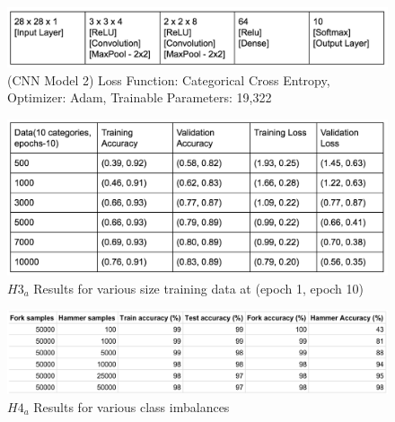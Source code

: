 \documentclass[11pt]{article}
\begin{document}
\begin{figure}[h!]
  \begin{center}
    \includegraphics[scale=0.5]{fig4}
  \end{center}
  \caption{(CNN Model 2) Loss Function: Categorical Cross Entropy, Optimizer:
    Adam, Trainable Parameters: 19,322}
  \label{fig:cnnArchPool}
\end{figure}


\begin{figure}[h!]
  \begin{center}
    \includegraphics[scale=0.5]{fig8}
    \end{center}
  \caption{$H3_a$ Results for various size training data at (epoch 1,
    epoch 10)}
  \label{fig:h3Results}
  \end{figure}


\begin{figure}[h!]
  \begin{center}
    \includegraphics[scale=0.5]{fig9}
    \end{center}
  \caption{$H4_a$ Results for various class imbalances}
  \label{fig:h4Results}
\end{figure}

\end{document}
